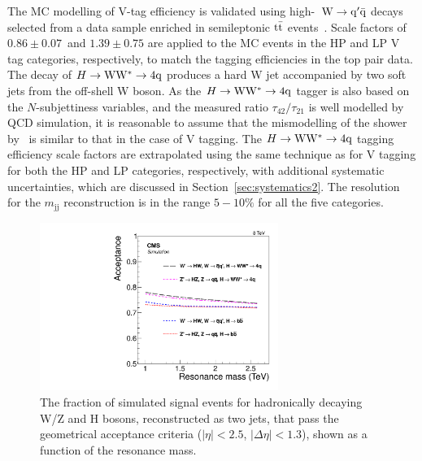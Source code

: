 The MC modelling of V-tag efficiency is validated 
using high-\pt~${\rm W \to q' \bar{q}}$
decays selected from a data sample enriched 
in semileptonic ${\rm t\bar{t}}$ events~\cite{JME-13-006}. 
Scale factors of $0.86 \pm 0.07$~and
$1.39 \pm 0.75$ are 
applied to the MC events in the HP and LP V tag categories, 
respectively, 
to match the tagging efficiencies
 in the top pair data. 
The decay of $H\to{\rm W}{\rm W}^*\to4{\rm q}$ produces a hard W jet accompanied by two soft jets
from the off-shell W boson.  
As the $H\to{\rm W}{\rm W}^*\to4{\rm q}$ tagger is also based 
on the $N$-subjettiness variables, 
and the measured ratio $\tau_{42}/\tau_{21}$ 
is well modelled by QCD simulation, it 
is reasonable to assume that the mismodelling 
of the shower by \PYTHIA~is similar to that 
in the case of V tagging.
The $H\to{\rm W}{\rm W}^*\to4{\rm q}$ tagging efficiency scale factors are extrapolated
using the same technique as 
for V tagging for both the HP and LP categories, respectively, with 
additional systematic uncertainties, which are discussed in Section~\ref{sec:systematics2}.
The resolution for the $m_\mathrm{jj}$ reconstruction is 
in the range $5 - 10\% $ for all the five categories.

\begin{figure}[th!b]
\begin{center}
\includegraphics[width=0.69\textwidth]{EXO-14-009/figs/HbbHwwV-signal-acc-8TeV.pdf}
\end{center}
\caption{The fraction of simulated signal events for hadronically
  decaying W/Z and H
  bosons, reconstructed as two jets, that
  pass the geometrical acceptance criteria ($|\eta| < 2.5$,
  $|\Delta\eta|<1.3$), shown as a function of the resonance 
  mass.}
\label{fig:acceptance}
\end{figure}


